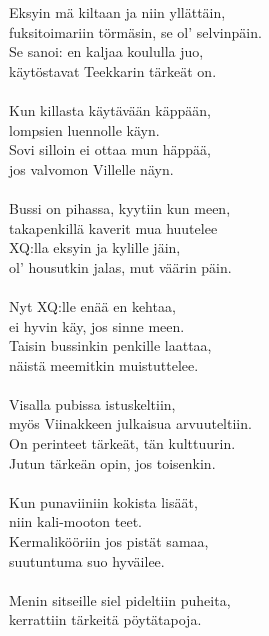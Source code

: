 
Eksyin mä kiltaan ja niin yllättäin,\\
fuksitoimariin törmäsin, se ol' selvinpäin.\\
Se sanoi: en kaljaa koululla juo,\\
käytöstavat Teekkarin tärkeät on.\\
\hspace{10mm} \\
Kun killasta käytävään käppään,\\
lompsien luennolle käyn.\\
Sovi silloin ei ottaa mun häppää,\\
jos valvomon Villelle näyn.\\
\hspace{10mm} \\
Bussi on pihassa, kyytiin kun meen,\\
takapenkillä kaverit mua huutelee\\
XQ:lla eksyin ja kylille jäin,\\
ol' housutkin jalas, mut väärin päin.\\
\hspace{10mm} \\
Nyt XQ:lle enää en kehtaa,\\
ei hyvin käy, jos sinne meen.\\
Taisin bussinkin penkille laattaa,\\
näistä meemitkin muistuttelee.\\
\hspace{10mm} \\
Visalla pubissa istuskeltiin,\\
myös Viinakkeen julkaisua arvuuteltiin.\\
On perinteet tärkeät, tän kulttuurin.\\
Jutun tärkeän opin, jos toisenkin.\\
\hspace{10mm} \\
Kun punaviiniin kokista lisäät,\\
niin kali-mooton teet.\\
Kermalikööriin jos pistät samaa,\\
suutuntuma suo hyväilee.\\
\hspace{10mm} \\
Menin sitseille siel pideltiin puheita,\\
kerrattiin tärkeitä pöytätapoja.\\

